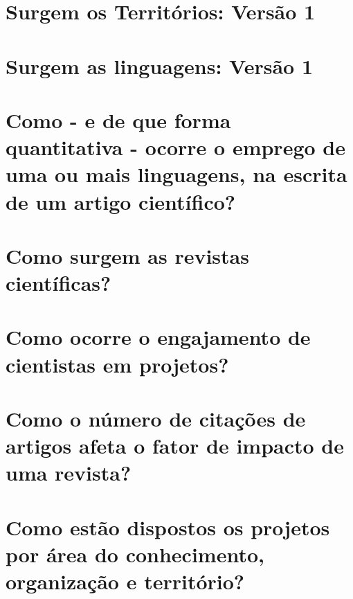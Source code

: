     \chapter{Surgem os Territórios: Versão 1\label{jhcf:surgem:os:territorios:analise:dados:empiricos}}
	
	
	
	\chapter{Surgem as linguagens: Versão 1 \label{surgemaslinguagens}}
	
	
	
	\chapter{ Como - e de que forma quantitativa - ocorre o emprego de uma ou mais linguagens, na escrita de um artigo científico?}
	
	
	
	
	\chapter{Como surgem as revistas científicas?}
	
	
	
	\chapter{Como ocorre o engajamento de cientistas em projetos?}
	
	
	
	\chapter{Como o número de citações de artigos afeta o fator de impacto de uma revista?}
	
	
	
    \chapter{Como estão dispostos os projetos por área do conhecimento, organização e território?}
    
